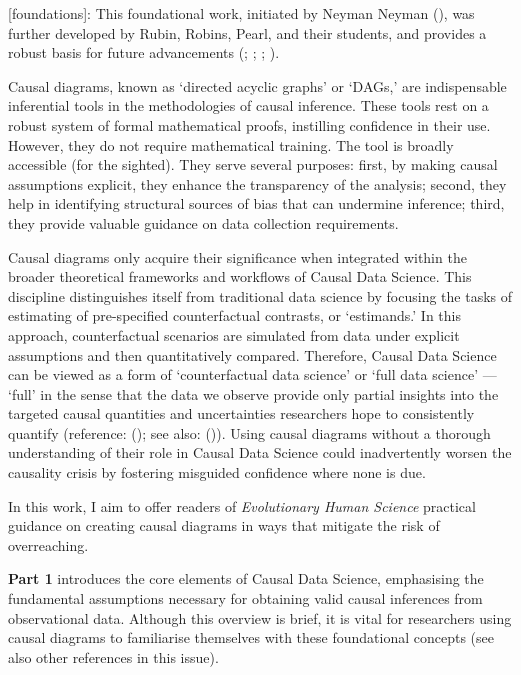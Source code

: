 \documentclass[
  singlecolumn,
  9pt]{article}
\begin{document}
{[}foundations{]}: This foundational work, initiated by Neyman Neyman
(), was further developed by Rubin,
Robins, Pearl, and their students, and provides a robust basis for
future advancements (; ;
;
).

Causal diagrams, known as `directed acyclic graphs' or `DAGs,' are
indispensable inferential tools in the methodologies of causal
inference. These tools rest on a robust system of formal mathematical
proofs, instilling confidence in their use. However, they do not require
mathematical training. The tool is broadly accessible (for the sighted).
They serve several purposes: first, by making causal assumptions
explicit, they enhance the transparency of the analysis; second, they
help in identifying structural sources of bias that can undermine
inference; third, they provide valuable guidance on data collection
requirements.

Causal diagrams only acquire their significance when integrated within
the broader theoretical frameworks and workflows of Causal Data Science.
This discipline distinguishes itself from traditional data science by
focusing the tasks of estimating of pre-specified counterfactual
contrasts, or `estimands.' In this approach, counterfactual scenarios
are simulated from data under explicit assumptions and then
quantitatively compared. Therefore, Causal Data Science can be viewed as
a form of `counterfactual data science' or `full data science' ---
`full' in the sense that the data we observe provide only partial
insights into the targeted causal quantities and uncertainties
researchers hope to consistently quantify (reference:
(); see also:
()). Using causal
diagrams without a thorough understanding of their role in Causal Data
Science could inadvertently worsen the causality crisis by fostering
misguided confidence where none is due.

In this work, I aim to offer readers of \emph{Evolutionary Human
Science} practical guidance on creating causal diagrams in ways that
mitigate the risk of overreaching.

\textbf{Part 1} introduces the core elements of Causal Data Science,
emphasising the fundamental assumptions necessary for obtaining valid
causal inferences from observational data. Although this overview is
brief, it is vital for researchers using causal diagrams to familiarise
themselves with these foundational concepts (see also other references
in this issue).
\end{document}
